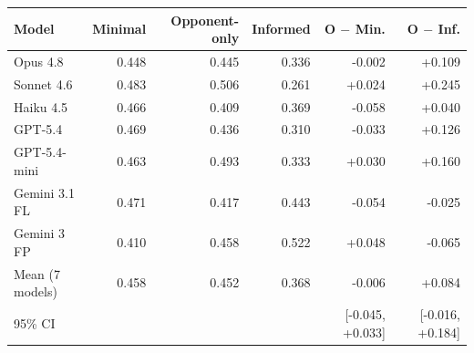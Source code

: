 \begin{tabular}{lrrrrr}
\toprule
Model & Minimal & Opponent-only & Informed & O $-$ Min. & O $-$ Inf. \\
\midrule
Opus 4.8 & 0.448 & 0.445 & 0.336 & -0.002 & +0.109 \\
Sonnet 4.6 & 0.483 & 0.506 & 0.261 & +0.024 & +0.245 \\
Haiku 4.5 & 0.466 & 0.409 & 0.369 & -0.058 & +0.040 \\
GPT-5.4 & 0.469 & 0.436 & 0.310 & -0.033 & +0.126 \\
GPT-5.4-mini & 0.463 & 0.493 & 0.333 & +0.030 & +0.160 \\
Gemini 3.1 FL & 0.471 & 0.417 & 0.443 & -0.054 & -0.025 \\
Gemini 3 FP & 0.410 & 0.458 & 0.522 & +0.048 & -0.065 \\
\midrule
Mean (7 models) & 0.458 & 0.452 & 0.368 & -0.006 & +0.084 \\
95\% CI & & & & [-0.045, +0.033] & [-0.016, +0.184] \\
\bottomrule
\end{tabular}

